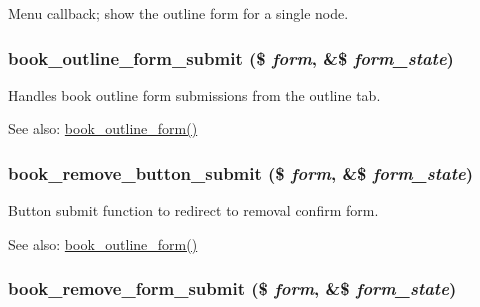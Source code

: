 Menu callback; show the outline form for a single node. \hypertarget{book_8pages_8inc_d5f27af5889dbe2ad72df81fd4cd2665}{
\subsubsection[{book\_\-outline\_\-form\_\-submit}]{\setlength{\rightskip}{0pt plus 5cm}book\_\-outline\_\-form\_\-submit (\$ {\em form}, \/  \&\$ {\em form\_\-state})}}
\label{book_8pages_8inc_d5f27af5889dbe2ad72df81fd4cd2665}


Handles book outline form submissions from the outline tab.

\begin{Desc}
\item[See also:]\hyperlink{group__forms_g63f60eeeafbddc518906941101553538}{book\_\-outline\_\-form()} \end{Desc}
\hypertarget{book_8pages_8inc_bcf4790efab7bbb44fda88de9ed0847e}{
\subsubsection[{book\_\-remove\_\-button\_\-submit}]{\setlength{\rightskip}{0pt plus 5cm}book\_\-remove\_\-button\_\-submit (\$ {\em form}, \/  \&\$ {\em form\_\-state})}}
\label{book_8pages_8inc_bcf4790efab7bbb44fda88de9ed0847e}


Button submit function to redirect to removal confirm form.

\begin{Desc}
\item[See also:]\hyperlink{group__forms_g63f60eeeafbddc518906941101553538}{book\_\-outline\_\-form()} \end{Desc}
\hypertarget{book_8pages_8inc_ca2b07a50dae6ef3a271b984dae19c7e}{
\subsubsection[{book\_\-remove\_\-form\_\-submit}]{\setlength{\rightskip}{0pt plus 5cm}book\_\-remove\_\-form\_\-submit (\$ {\em form}, \/  \&\$ {\em form\_\-state})}}
\label{book_8pages_8inc_ca2b07a50dae6ef3a271b984dae19c7e}


